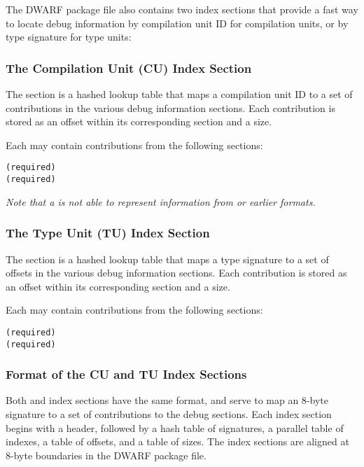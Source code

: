 The DWARF package file also contains two index sections that
provide a fast way to locate debug information by compilation
unit ID for compilation units, or by type
signature for type units:
\begin{alltt}
    \dotdebugcuindex
    \dotdebugtuindex
\end{alltt}

\subsubsection{The Compilation Unit (CU) Index Section}
The \dotdebugcuindex{} section is a hashed lookup table that maps a
compilation unit ID to a set of contributions in the
various debug information sections. Each contribution is stored
as an offset within its corresponding section and a size.

Each \compunitset{} may contain contributions from the
following sections:
\begin{alltt}
    \dotdebuginfodwo{} (required)
    \dotdebugabbrevdwo{} (required)
    \dotdebuglinedwo
    \dotdebugloclistsdwo
    \dotdebugrnglistsdwo
    \dotdebugstroffsetsdwo
    \dotdebugmacrodwo
\end{alltt}

\textit{Note that a \compunitset{} is not able to represent \dotdebugmacinfo{}
information from \DWARFVersionIV{} or earlier formats.}

\subsubsection{The Type Unit (TU) Index Section}
The \dotdebugtuindex{} section is a hashed lookup table that maps a
type signature to a set of offsets in the various debug
information sections. Each contribution is stored as an offset
within its corresponding section and a size.

Each \typeunitset{} may contain contributions from the following
sections:
\begin{alltt}
    \dotdebuginfodwo{} (required) 
    \dotdebugabbrevdwo{} (required)
    \dotdebuglinedwo
    \dotdebugstroffsetsdwo
\end{alltt}

\subsubsection{Format of the CU and TU Index Sections}
\bb
Both \dotdebugcuindex{} and \dotdebugtuindex{}
\eb
index sections have the same format, and serve to map an
8-byte signature to a set of contributions to the debug sections.
Each index section begins with a header, followed by a hash table of
signatures, a parallel table of indexes, a table of offsets, and
a table of sizes. The index sections are aligned at 8-byte
boundaries in the DWARF package file.

